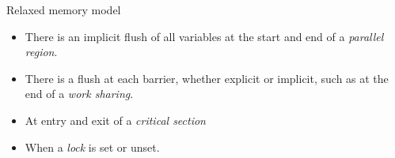   
 {Relaxed memory model}
\label{sec:omp:flush}


\begin{itemize}
\item There is an implicit flush of all variables at the start and end 
  of a \emph{parallel region}.
\item There is a flush at each barrier, whether explicit or implicit,
  such as at the end of a \emph{work sharing}.
\item At entry and exit of a \emph{critical section}
\item When a \emph{lock} is set or unset.
\end{itemize}


